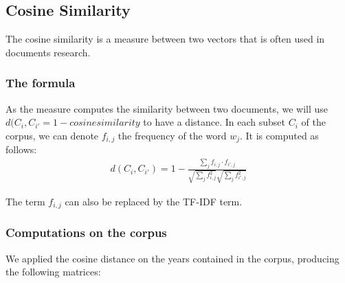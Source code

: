 \subsection{Cosine Similarity}

The cosine similarity is a measure between two vectors that is often used in documents research.

\subsubsection{The formula}

As the measure computes the similarity between two documents,  we will use $d(C_i,C_{i'} = 1 - cosine similarity$ to have a distance. In each subset $C_i$ of the corpus, we can denote $f_{i,j}$ the frequency of the word $w_j$. It is computed as follows:
\begin{eqnarray}
 d(C_i,C_{i'}) = 1 - \frac{\sum_j f_{i,j}\cdot f_{i',j}}{\sqrt{\sum_j f_{i,j}^2} \sqrt{\sum_j f_{i',j}^2 }}
\end{eqnarray}

The term $f_{i,j}$ can also be replaced by the TF-IDF term.

\subsubsection{Computations on the corpus}

We applied the cosine distance on the years contained in the corpus, producing the following matrices:

